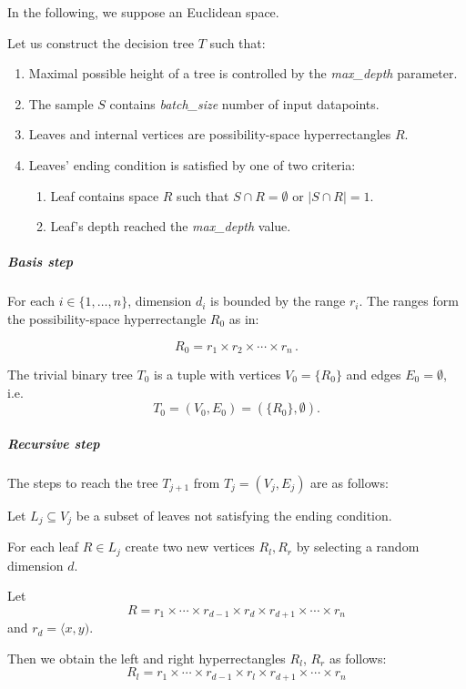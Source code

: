 In the following, we suppose an Euclidean space.

Let us construct the decision tree $T$ such that:

\begin{enumerate}
    \item Maximal possible height of a tree is controlled by the \emph{max\_depth} parameter.
    \item The sample \(S\) contains \emph{batch\_size} number of input datapoints.
    \item Leaves and internal vertices are possibility-space hyperrectangles \(R\). 
    \item Leaves' ending condition is satisfied by one of two criteria: 
\begin{enumerate}
    \item Leaf contains space \(R\) such that \(S \cap R = \emptyset\) or \(| S \cap R | = 1\).
    \item Leaf's depth reached the \emph{max\_depth} value.
\end{enumerate}
\end{enumerate}



\subparagraph{Basis step}

For each \(i \in\{1, \dots, n\}\), dimension \(d_i\) is bounded by the range \(r_i\). The ranges form the possibility-space hyperrectangle \(R_0\) as in:

\[R_0 =  r_1 \times r_2 \times \cdots \times r_n  \tag{xx}\,.\]

The trivial binary tree \(T_0\) is a tuple with
vertices \(V_0 = \{R_0\}\) and edges \(E_0 = \emptyset\), i.e.
\[T_0= (V_0, E_0) = (\{R_0\},\emptyset).\]

\subparagraph{Recursive step}

The steps to reach the tree \(T_{j+1}\) from \(T_{j} = (V_j, E_j)\) are
as follows:

Let \(L_j \subseteq V_j\) be a subset of leaves not satisfying the
ending condition. 

For each leaf \(R \in L_j\) create two new vertices \(R_l, R_r\) by
selecting a random dimension \(d\).

Let
\[R = r_1 \times  \cdots \times r_{d-1} \times  r_d\times r_{d+1} \times \cdots \times r_n  \tag{x}\]
and \(r_d = \langle x, y )\).

Then we obtain the left and right hyperrectangles \(R_l\), \(R_r\) as
follows:
\[R_l = r_1 \times  \cdots \times r_{d-1} \times  r_l \times r_{d+1} \times \cdots \times r_n  \tag{x}\]

